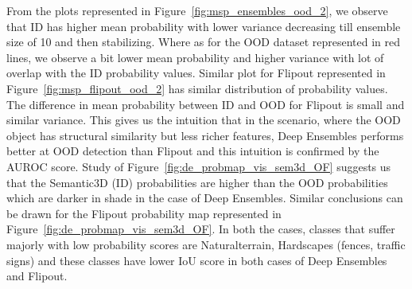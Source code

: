     From the plots represented in Figure~\ref{fig:msp_ensembles_ood_2}, we observe that ID has higher mean probability with lower variance decreasing till ensemble size of 10 and then stabilizing.
    Where as for the OOD dataset represented in red lines, we observe a bit lower mean probability and higher variance with lot of overlap with the ID probability values.
    Similar plot for Flipout represented in Figure~\ref{fig:msp_flipout_ood_2} has similar distribution of probability values.
    The difference in mean probability between ID and OOD for Flipout is small and similar variance.
    This gives us the intuition that in the scenario, where the OOD object has structural similarity but less richer features, Deep Ensembles performs better at OOD detection than Flipout and this intuition is confirmed by the AUROC score.
    Study of Figure~\ref{fig:de_probmap_vis_sem3d_OF} suggests us that the Semantic3D (ID) probabilities are higher than the OOD probabilities which are darker in shade in the case of Deep Ensembles.
    Similar conclusions can be drawn for the Flipout probability map represented in Figure~\ref{fig:de_probmap_vis_sem3d_OF}.
    In both the cases, classes that suffer majorly with low probability scores are Naturalterrain, Hardscapes (fences, traffic signs) and these classes have lower IoU score in both cases of Deep Ensembles and Flipout.
